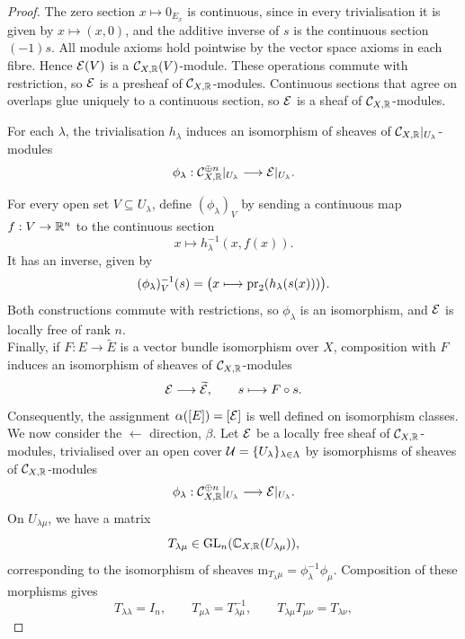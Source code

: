 \documentclass[12pt,a4paper]{article}
\begin{document}
\begin{proof}
The zero section $x \mapsto 0_{E_x}$ is continuous, since in every trivialisation it is given by $x \mapsto (x,0)$, and the additive inverse of $s$ is the continuous section $(-1)s$. All module axioms
hold pointwise by the vector space axioms in each fibre. Hence $\mathcal{E}(V)$ is a $\mathcal{C}_{X,\mathbb{R}}(V)$-module. These operations commute with restriction, so $\mathcal{E}$ is a presheaf of $\mathcal{C}_{X,\mathbb{R}}$-modules. Continuous sections that agree on overlaps glue uniquely to a
continuous section, so $\mathcal{E}$ is a sheaf of
$\mathcal{C}_{X,\mathbb{R}}$-modules.

For each $\lambda$, the trivialisation $h_\lambda$ induces an isomorphism of sheaves of $\mathcal{C}_{X,\mathbb{R}}|_{U_\lambda}$-modules
\[
    \phi_\lambda:
    \mathcal{C}_{X,\mathbb{R}}^{\oplus n}|_{U_\lambda} \longrightarrow \mathcal{E}|_{U_\lambda}.
\]

For every open set $V \subseteq U_\lambda$, define $(\phi_\lambda)_V$ by sending a continuous map $f:V \to \mathbb{R}^n$ to the continuous section
\[
    x \longmapsto h_\lambda^{-1}(x,f(x)).
\]
It has an inverse, given by
\[
    (\phi_\lambda)_V^{-1}(s)
    =
    \bigl(x \longmapsto \operatorname{pr}_2(h_\lambda(s(x)))\bigr).
\]
Both constructions commute with restrictions, so $\phi_\lambda$ is an isomorphism, and $\mathcal{E}$ is locally free of rank $n$. \\

Finally, if $F:E \to \widetilde E$ is a vector bundle isomorphism
over $X$, composition with $F$ induces an isomorphism of sheaves
of $\mathcal{C}_{X,\mathbb{R}}$-modules
\[
    \mathcal{E} \longrightarrow \widetilde{\mathcal{E}},
    \qquad s \longmapsto F \circ s.
\]
Consequently, the assignment $\alpha([E])=[\mathcal{E}]$ is well defined on isomorphism classes.\\

We now consider the $\leftarrow$ direction, $\beta$. Let $\mathcal{E}$ be a locally free sheaf of $\mathcal{C}_{X,\mathbb{R}}$-modules, trivialised over an open cover $\mathcal{U}=\{U_\lambda\}_{\lambda \in \Lambda}$ by isomorphisms of sheaves of $\mathcal{C}_{X,\mathbb{R}}$-modules
\begin{equation}
    \phi_\lambda:
    \mathcal{C}_{X,\mathbb{R}}^{\oplus n}|_{U_\lambda} \longrightarrow \mathcal{E}|_{U_\lambda}.
\end{equation}
On $U_{\lambda \mu}$, we have a matrix 
\begin{equation}
    T_{\lambda \mu} \in \operatorname{GL}_n(\mathbb{C}_{X,\mathbb{R}}(U_{\lambda\mu})),
\end{equation}
corresponding to the isomorphism of sheaves $\mathrm m_{T_\lambda \mu} = \phi_\lambda^{-1} \phi_\mu$. Composition of these morphisms gives
\begin{equation}\label{thm2:eq:transition functions}
    T_{\lambda\lambda}=I_n,
    \qquad
    T_{\mu\lambda}=T_{\lambda\mu}^{-1},
    \qquad
    T_{\lambda\mu}T_{\mu\nu}=T_{\lambda\nu},
\end{equation}


\end{proof}
\end{document}
